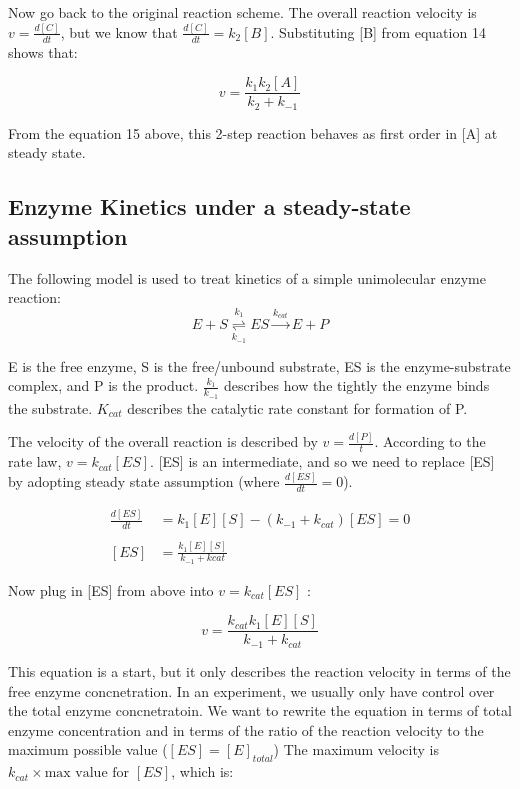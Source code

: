 \documentclass[12pt, letterpaper]{article}
\begin{document}
    Now go back to the original reaction scheme. The overall reaction velocity is \( v = \frac{d[C]}{dt} \), but 
    we know that \( \frac{d[C]}{dt} = k_2[B] \). Substituting [B] from equation 14 shows that: 

    \begin{equation}
        v = \frac{k_1 k_2 [A]}{k_2 + k_{-1}}    
    \end{equation}

    From the equation 15 above, this 2-step reaction behaves as first order in [A] at steady state. 
   
    \subsection*{Enzyme Kinetics under a steady-state assumption}

    The following model is used to treat kinetics of a simple unimolecular enzyme reaction: 
    \begin{equation}
        E + S \stackrel{k_1}{\underset{k_{-1}}{\rightleftharpoons}} ES \stackrel{k_{cat}} \longrightarrow E + P
    \end{equation}

    E is the free enzyme, S is the free/unbound substrate, ES is the enzyme-substrate complex, and P is the product. 
    \( \frac{k_1}{k_{-1}} \) describes how the tightly the enzyme binds the substrate. $K_{cat}$ describes the catalytic rate 
    constant for formation of P. 

    The velocity of the overall reaction is described by \( v = \frac{d[P]}{t} \). According to the rate law, $v = k_{cat}[ES]$. 
    [ES] is an intermediate, and so we need to replace [ES] by adopting steady state assumption (where $\frac{d[ES]}{dt} = 0$).

    \begin{align*}
        \frac{d[ES]}{dt} &= k_1[E][S] - (k_{-1} + k_{cat})[ES] = 0 \\ \\
        [ES] &= \frac{k_1[E][S]}{k_{-1} + k{cat}}
    \end{align*}

    Now plug in [ES] from above into $v = k_{cat}[ES]$ : 

    \begin{equation}
        v =  \frac{k_{cat}k_1[E][S]}{k_{-1} + k_{cat}}
    \end{equation}

    This equation is a start, but it only describes the reaction velocity in terms of the free enzyme concnetration. 
    In an experiment, we usually only have control over the total enzyme concnetratoin. We want to rewrite the equation 
    in terms of total enzyme concentration and in terms of the ratio of the reaction velocity to the maximum possible value ($[ES] = [E]_{total}$)
    The maximum velocity is $k_{cat} \times \text{max value for } [ES]$, which is: 
\end{document}
